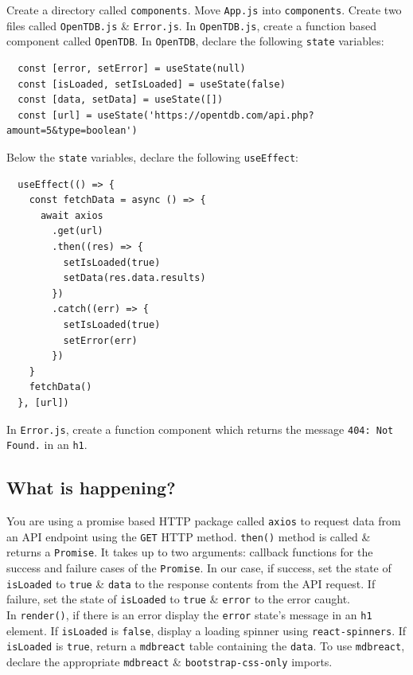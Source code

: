 \documentclass{article}
\begin{document}
Create a directory called \texttt{components}. Move \texttt{App.js} into \texttt{components}. Create two files called \texttt{OpenTDB.js} \& \texttt{Error.js}. In \texttt{OpenTDB.js}, create a function based component called \texttt{OpenTDB}. In \texttt{OpenTDB}, declare the following \texttt{state} variables:
\begin{verbatim}
  const [error, setError] = useState(null)
  const [isLoaded, setIsLoaded] = useState(false)
  const [data, setData] = useState([])
  const [url] = useState('https://opentdb.com/api.php?amount=5&type=boolean')
\end{verbatim}

Below the \texttt{state} variables, declare the following \texttt{useEffect}:
\begin{verbatim}
  useEffect(() => {
    const fetchData = async () => {
      await axios
        .get(url)
        .then((res) => {
          setIsLoaded(true)
          setData(res.data.results)
        })
        .catch((err) => {
          setIsLoaded(true)
          setError(err)
        })
    }
    fetchData()
  }, [url])
\end{verbatim}

In \texttt{Error.js}, create a function component which returns the message \texttt{404: Not Found.} in an \texttt{h1}.

\subsection*{What is happening?} 
You are using a promise based HTTP package called \texttt{axios} to request data from an API endpoint using the \texttt{GET} HTTP method. \texttt{then()} method is called \& returns a \texttt{Promise}. It takes up to two arguments: callback functions for the success and failure cases of the \texttt{Promise}. In our case, if success, set the state of \texttt{isLoaded} to \texttt{true} \& \texttt{data} to the response contents from the API request. If failure, set the state of \texttt{isLoaded} to \texttt{true} \& \texttt{error} to the error caught. \\

In \texttt{render()}, if there is an error display the \texttt{error} state's message in an \texttt{h1} element. If \texttt{isLoaded} is \texttt{false}, display a loading spinner using \texttt{react-spinners}. If \texttt{isLoaded} is \texttt{true}, return a \texttt{mdbreact} table containing the \texttt{data}. To use \texttt{mdbreact}, declare the appropriate \texttt{mdbreact} \& \texttt{bootstrap-css-only} imports. \\
\end{document}

